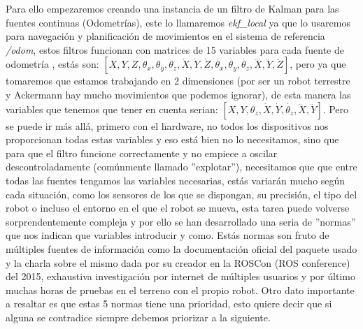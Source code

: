 Para ello empezaremos creando una instancia de un filtro de Kalman para las fuentes continuas (Odometrías), este lo llamaremos 
\textit{ekf\_local} ya que lo usaremos para navegación y planificación de movimientos en el sistema de referencia \textit{/odom}, estos 
filtros funcionan con matrices de 15 variables para cada fuente de odometría  , estás son: 
$[ X,Y,Z,\theta_{x},\theta_{y},\theta_{z},\dot{X},\dot{Y},\dot{Z},\dot{\theta_{x}},\dot{\theta_{y}},\dot{\theta_{z}},\ddot{X},\ddot{Y},\ddot{Z} ]$,
pero ya que tomaremos que estamos trabajando en 2 dimensiones (por ser un robot terrestre y Ackermann hay mucho movimientos que podemos 
ignorar), de esta manera las variables que tenemos que tener en cuenta serian: 
$[ X,Y,\theta_{z},\dot{X},\dot{Y},\dot{\theta_{z}},\ddot{X},\ddot{Y}]$. Pero se puede ir más allá, primero con el hardware, no todos los dispositivos nos proporcionan todas estas variables y eso está bien no lo necesitamos, sino que para que 
el filtro funcione correctamente y no empiece a oscilar descontroladamente (comúnmente llamado ''explotar''), necesitamos que que entre 
todas las fuentes
tengamos las variables necesarias, estás variarán mucho según cada situación, como los sensores de los que se dispongan, su precisión, el 
tipo del robot o incluso el entorno en el que el robot se mueva, esta tarea puede volverse sorprendentemente compleja
y por ello se han desarrollado una seria de ''normas'' que nos indican que variables introducir y como. Estás normas son fruto de múltiples 
fuentes de información como la documentación oficial del paquete usado y la charla sobre el mismo dada por su creador en la ROSCon 
(ROS conference) del 2015, exhaustiva investigación por internet de múltiples usuarios y por último muchas horas de pruebas en el terreno 
con el propio robot. Otro dato importante a resaltar es que estas 5 normas tiene una prioridad, esto quiere decir que si alguna se 
contradice siempre debemos priorizar a la siguiente.  

